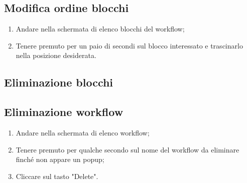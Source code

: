 \subsection{Modifica ordine blocchi}
\begin{enumerate}
	\item Andare nella schermata di elenco blocchi del workflow;
	\item Tenere premuto per un paio di secondi sul blocco interessato e trascinarlo nella posizione desiderata.
\end{enumerate}

\subsection{Eliminazione blocchi}

\subsection{Eliminazione workflow}
\begin{enumerate}
	\item Andare nella schermata di elenco workflow;
	\item Tenere premuto per qualche secondo sul nome del workflow da eliminare finché non appare un popup;
	\item Cliccare sul tasto "Delete".
\end{enumerate}

\newpage
